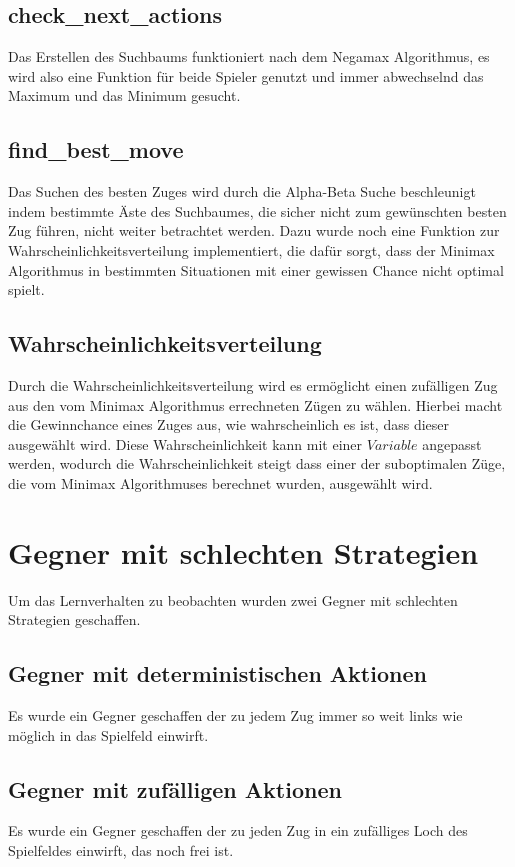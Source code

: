 \subsection{check\_next\_actions}
Das Erstellen des Suchbaums funktioniert nach dem Negamax Algorithmus, es wird also eine Funktion für beide Spieler genutzt und immer abwechselnd das Maximum und das Minimum gesucht.

\subsection{find\_best\_move}
Das Suchen des besten Zuges wird durch die Alpha-Beta Suche beschleunigt indem bestimmte Äste des Suchbaumes, die sicher nicht zum gewünschten besten Zug führen, nicht weiter betrachtet werden. Dazu wurde noch eine Funktion zur Wahrscheinlichkeitsverteilung implementiert, die dafür sorgt, dass der Minimax Algorithmus in bestimmten Situationen mit einer gewissen Chance nicht optimal spielt.

\subsection{Wahrscheinlichkeitsverteilung}
Durch die Wahrscheinlichkeitsverteilung wird es ermöglicht einen zufälligen Zug aus den vom Minimax Algorithmus errechneten Zügen zu wählen. Hierbei macht die Gewinnchance eines Zuges aus, wie wahrscheinlich es ist, dass dieser ausgewählt wird. Diese Wahrscheinlichkeit kann mit einer $Variable$ angepasst werden, wodurch die  Wahrscheinlichkeit steigt dass einer der suboptimalen Züge, die vom Minimax Algorithmuses berechnet wurden, ausgewählt wird. 

\section{Gegner mit schlechten Strategien}
Um das Lernverhalten zu beobachten wurden zwei Gegner mit schlechten Strategien geschaffen.

\subsection{Gegner mit deterministischen Aktionen}
Es wurde ein Gegner geschaffen der zu jedem Zug immer so weit links wie möglich in das Spielfeld einwirft. 

\subsection{Gegner mit zufälligen Aktionen}
Es wurde ein Gegner geschaffen der zu jeden Zug in ein zufälliges Loch des Spielfeldes einwirft, das noch frei ist.


